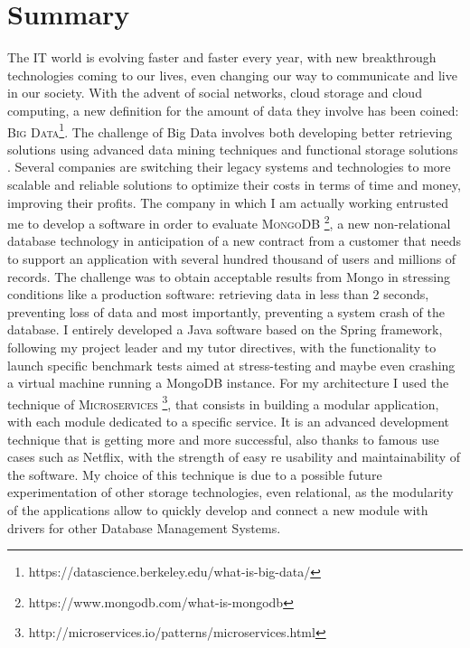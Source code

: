 \chapter*{Summary} %
\label{Summary}


The IT world is evolving faster and faster every year, with new breakthrough technologies coming to our lives, even changing our way to communicate and live in our society. With the advent of social networks, cloud storage and cloud computing, a new definition for the amount of data they involve has been coined: \textsc{Big Data}\footnote{https://datascience.berkeley.edu/what-is-big-data/}.
The challenge of Big Data involves both developing better retrieving solutions using advanced data mining techniques and functional storage solutions \cite{whitepaper}.
Several companies are switching their legacy systems and technologies to more scalable and reliable solutions to optimize their costs in terms of time and money, improving their profits.
The company in which I am actually working entrusted me to develop a software in order to evaluate \textsc{MongoDB} \footnote{https://www.mongodb.com/what-is-mongodb}, a new non-relational database technology in anticipation of a new  contract from a customer that needs to support an application with several hundred thousand of users and millions of records.
The challenge was to obtain acceptable results from Mongo in stressing conditions like a production software: retrieving data in less than 2 seconds, preventing loss of data and most importantly, preventing a system crash of the database.
I entirely developed a Java software based on the Spring framework, following my project leader and my tutor directives, with the functionality to launch specific benchmark tests aimed at stress-testing and maybe even crashing a virtual machine running a MongoDB instance.
For my architecture I used the technique of \textsc{Microservices} \footnote{http://microservices.io/patterns/microservices.html}, that consists in building a modular application, with each module dedicated to a specific service. It is an advanced development technique that is getting more and more successful, also thanks to famous use cases such as Netflix, with the strength of easy re usability and maintainability of the software.
My choice of this technique is due to a possible future experimentation of other storage technologies, even relational, as the modularity of the applications allow to quickly develop and connect a new module with drivers for other Database Management Systems.
